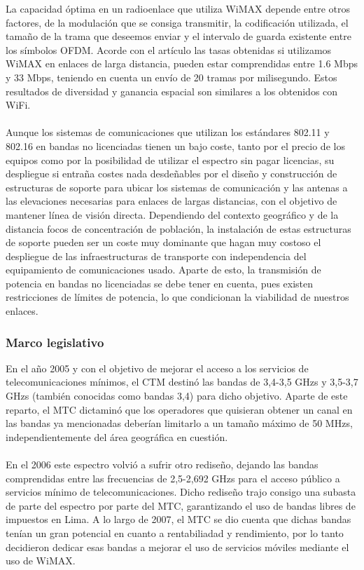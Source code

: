 La capacidad óptima en un radioenlace que utiliza WiMAX depende entre otros factores, de la modulación que se consiga transmitir, la codificación utilizada, el tamaño de la trama que deseemos enviar y el intervalo de guarda existente entre los símbolos OFDM. Acorde con el artículo \cite{simo2014assessing} las tasas obtenidas si utilizamos WiMAX en enlaces de larga distancia, pueden estar comprendidas entre 1.6 Mbps y 33 Mbps, teniendo en cuenta un envío de 20 tramas por milisegundo. Estos resultados de diversidad y ganancia espacial son similares a los obtenidos con WiFi. \\\\
		
Aunque los sistemas de comunicaciones que utilizan los estándares 802.11 y 802.16 en bandas no licenciadas tienen un bajo coste, tanto por el precio de los equipos como por la posibilidad de utilizar el espectro sin pagar licencias, su despliegue si entraña costes nada desdeñables por el diseño y construcción de estructuras de soporte para ubicar los sistemas de comunicación y las antenas a las elevaciones necesarias para enlaces de largas distancias, con el objetivo de mantener línea de visión directa. Dependiendo del contexto geográfico y de la distancia focos de concentración de población, la instalación de estas estructuras de soporte pueden ser un coste muy dominante que hagan muy costoso el despliegue de las infraestructuras de transporte con independencia del equipamiento de comunicaciones usado. Aparte de esto, la transmisión de potencia en bandas no licenciadas se debe tener en cuenta, pues existen restricciones de límites de potencia, lo que condicionan la viabilidad de nuestros enlaces.

\subsubsection{Marco legislativo}
En el año 2005 y con el objetivo de mejorar el acceso a los servicios de telecomunicaciones mínimos, el CTM destinó las bandas de 3,4-3,5 GHzs y 3,5-3,7 GHzs (también conocidas como bandas 3,4) para dicho objetivo. Aparte de este reparto, el MTC dictaminó que los operadores que quisieran obtener un canal en las bandas ya mencionadas deberían limitarlo a un tamaño máximo de 50 MHzs, independientemente del área geográfica en cuestión.\\\\

En el 2006 este espectro volvió a sufrir otro rediseño, dejando las bandas comprendidas entre las frecuencias de 2,5-2,692 GHzs para el acceso público a servicios mínimo de telecomunicaciones. Dicho rediseño trajo consigo una subasta de parte del espectro por parte del MTC, garantizando el uso de bandas libres de impuestos en Lima. A lo largo de 2007, el MTC se dio cuenta que dichas bandas tenían un gran potencial en cuanto a rentabiliadad y rendimiento, por lo tanto decidieron dedicar esas bandas a mejorar el uso de servicios móviles mediante el uso de WiMAX.\\\\

